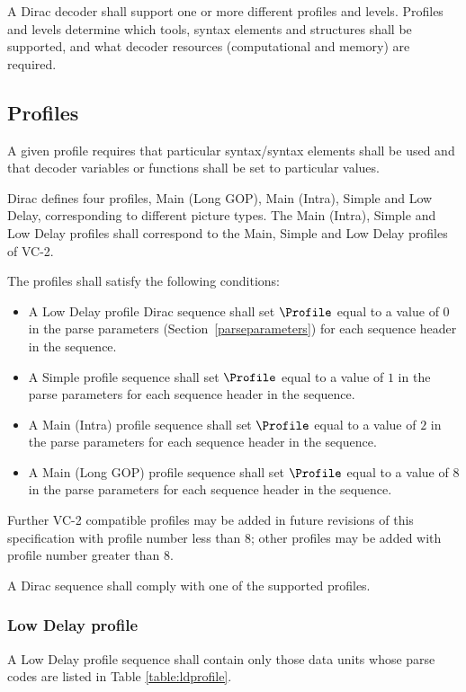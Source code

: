 \label{profilelevel}

A Dirac decoder shall support one or more different profiles and levels. 
Profiles and levels determine which tools, syntax elements and structures 
shall be supported, and what decoder resources (computational and memory) are required.

\subsection{Profiles}
\label{profiles}
A given profile requires that particular syntax/syntax elements shall 
be used and that decoder variables or functions shall be set to particular values.

Dirac defines four profiles, Main (Long GOP), Main (Intra), Simple and Low Delay, 
corresponding to different picture types. The Main (Intra), Simple and Low Delay
profiles shall correspond to the Main, Simple and Low Delay profiles of VC-2. 

The profiles shall satisfy the following conditions:
\begin{itemize}
\item A Low Delay profile Dirac sequence shall set $\Profile$ equal to a value of 
$0$ in the parse parameters (Section~\ref{parseparameters}) for each sequence header
in the sequence.
\item A Simple profile sequence shall set $\Profile$ equal to a value of $1$ 
in the parse parameters for each sequence header in the sequence.
\item A Main (Intra) profile sequence shall set $\Profile$ equal to a value of $2$ 
in the parse parameters for each sequence header in the sequence.
\item A Main (Long GOP) profile sequence shall set $\Profile$ equal to a value of $8$ 
in the parse parameters for each sequence header in the sequence.
\end{itemize}

Further VC-2 compatible profiles may be added in future revisions of this 
specification with profile number less than 8; other profiles may be added with
profile number greater than 8.

A Dirac sequence shall comply with one of the supported profiles.

\subsubsection{Low Delay profile}

A Low Delay profile sequence shall contain only those data units whose 
parse codes are listed in Table \ref{table:ldprofile}.

